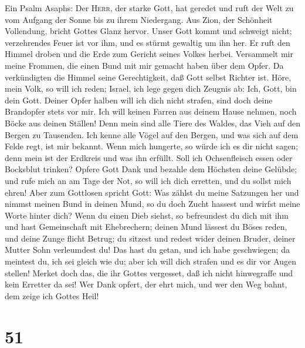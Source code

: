  Ein Psalm Asaphs: Der \textsc{Herr}, der starke Gott, hat
geredet und ruft der Welt zu vom Aufgang der Sonne bis zu ihrem
Niedergang.  Aus Zion, der Schönheit Vollendung, bricht
Gottes Glanz hervor.  Unser Gott kommt und schweigt nicht;
verzehrendes Feuer ist vor ihm, und es stürmt gewaltig um ihn her.
 Er ruft den Himmel droben und die Erde zum Gericht seines
Volkes herbei.  Versammelt mir meine Frommen, die einen
Bund mit mir gemacht haben über dem Opfer.  Da
verkündigten die Himmel seine Gerechtigkeit, daß Gott selbst Richter
ist.  Höre, mein Volk, so will ich reden; Israel, ich lege
gegen dich Zeugnis ab: Ich, Gott, bin dein Gott.  Deiner
Opfer halben will ich dich nicht strafen, sind doch deine Brandopfer
stets vor mir.  Ich will keinen Farren aus deinem Hause
nehmen, noch Böcke aus deinen Ställen!  Denn mein sind
alle Tiere des Waldes, das Vieh auf den Bergen zu Tausenden.
 Ich kenne alle Vögel auf den Bergen, und was sich auf
dem Felde regt, ist mir bekannt.  Wenn mich hungerte, so
würde ich es dir nicht sagen; denn mein ist der Erdkreis und was ihn
erfüllt.  Soll ich Ochsenfleisch essen oder Bocksblut
trinken?  Opfere Gott Dank und bezahle dem Höchsten deine
Gelübde;  und rufe mich an am Tage der Not, so will ich
dich erretten, und du sollst mich ehren!  Aber zum
Gottlosen spricht Gott: Was zählst du meine Satzungen her und nimmst
meinen Bund in deinen Mund,  so du doch Zucht hassest und
wirfst meine Worte hinter dich?  Wenn du einen Dieb
siehst, so befreundest du dich mit ihm und hast Gemeinschaft mit
Ehebrechern;  deinen Mund lässest du Böses reden, und
deine Zunge flicht Betrug;  du sitzest und redest wider
deinen Bruder, deiner Mutter Sohn verleumdest du!  Das
hast du getan, und ich habe geschwiegen; da meintest du, ich sei gleich
wie du; aber ich will dich strafen und es dir vor Augen stellen!
 Merket doch das, die ihr Gottes vergesset, daß ich nicht
hinwegraffe und kein Erretter da sei!  Wer Dank opfert,
der ehrt mich, und wer den Weg bahnt, dem zeige ich Gottes Heil!

\hypertarget{section-50}{%
\section{51}\label{section-50}}

